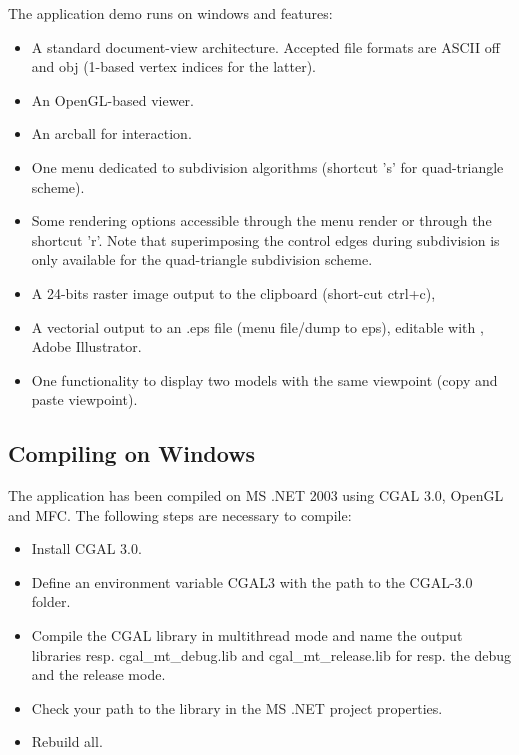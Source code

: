 
The application demo runs on windows and features:
\begin{itemize}

\item 
A standard document-view architecture. Accepted file formats are ASCII
off and obj (1-based vertex indices for the latter).

\item 
An OpenGL-based viewer.

\item 
An arcball for interaction.

\item 
One menu dedicated to subdivision algorithms (shortcut 's' for
quad-triangle scheme).

\item 
Some rendering options accessible through the menu render or through
the shortcut 'r'. Note that superimposing the control edges during
subdivision is only available for the quad-triangle subdivision
scheme.

\item 
A 24-bits raster image output to the clipboard (short-cut ctrl+c),

\item 
A vectorial output to an .eps file (menu file/dump to eps), editable
with , Adobe Illustrator.

\item 
One functionality to display two models with the same viewpoint (copy
and paste viewpoint).

\end{itemize}

\subsection{Compiling on Windows}

The application has been compiled on MS .NET 2003 using CGAL 3.0,
OpenGL and MFC. The following steps are necessary to compile:
\begin{itemize}
\item Install CGAL 3.0.
\item Define an environment variable CGAL3 with the path to the CGAL-3.0 folder.
\item Compile the CGAL library in multithread mode and name the output 
      libraries resp. cgal\_mt\_debug.lib and cgal\_mt\_release.lib 
      for resp. the debug and the release mode.
\item Check your path to the library in the MS .NET project
      properties.
\item Rebuild all.
\end{itemize}
